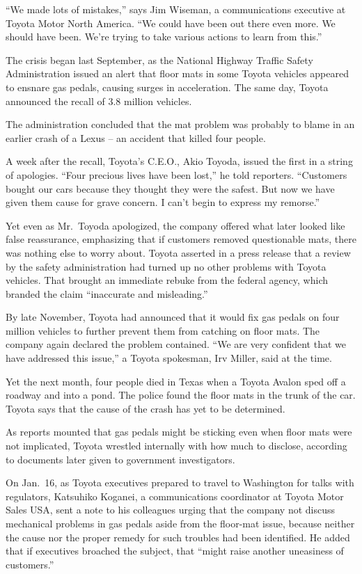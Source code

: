 ﻿\documentclass[12pt]{article}
\begin{document}
``We made lots of mistakes,'' says Jim Wiseman, a communications executive at Toyota Motor North
America. ``We could have been out there even more. We should have been. We're trying to take various
actions to learn from this.''

The crisis began last September, as the National Highway Traffic Safety Administration issued an
alert that floor mats in some Toyota vehicles appeared to ensnare gas pedals, causing surges in
acceleration. The same day, Toyota announced the recall of 3.8 million vehicles.

The administration concluded that the mat problem was probably to blame in an earlier crash of a
Lexus -- an accident that killed four people.

A week after the recall, Toyota's C.E.O., Akio Toyoda, issued the first in a string of apologies.
``Four precious lives have been lost,'' he told reporters. ``Customers bought our cars because they
thought they were the safest. But now we have given them cause for grave concern. I can't begin to
express my remorse.''

Yet even as Mr.~Toyoda apologized, the company offered what later looked like false reassurance,
emphasizing that if customers removed questionable mats, there was nothing else to worry about.
Toyota asserted in a press release that a review by the safety administration had turned up no other
problems with Toyota vehicles. That brought an immediate rebuke from the federal agency, which
branded the claim ``inaccurate and misleading.''

By late November, Toyota had announced that it would fix gas pedals on four million vehicles to
further prevent them from catching on floor mats. The company again declared the problem contained.
``We are very confident that we have addressed this issue,'' a Toyota spokesman, Irv Miller, said at
the time.

Yet the next month, four people died in Texas when a Toyota Avalon sped off a roadway and into a
pond. The police found the floor mats in the trunk of the car. Toyota says that the cause of the
crash has yet to be determined.

As reports mounted that gas pedals might be sticking even when floor mats were not implicated,
Toyota wrestled internally with how much to disclose, according to documents later given to
government investigators.

On Jan.~16, as Toyota executives prepared to travel to Washington for talks with regulators,
Katsuhiko Koganei, a communications coordinator at Toyota Motor Sales USA, sent a note to his
colleagues urging that the company not discuss mechanical problems in gas pedals aside from the
floor-mat issue, because neither the cause nor the proper remedy for such troubles had been
identified. He added that if executives broached the subject, that ``might raise another uneasiness
of customers.''
\end{document}
